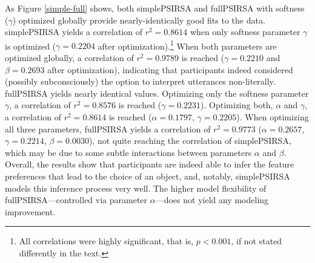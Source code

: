 \documentclass[10pt,a4paper]{article}
\begin{document}
As Figure \ref{simple-full} shows, both simplePSIRSA and fullPSIRSA with softness ($\gamma$) optimized globally provide nearly-identically good fits to the data.
simplePSIRSA yields a correlation of $r^2 = 0.8614$ when only softness parameter $\gamma$ is optimized ($\gamma=0.2204$ after optimization).\footnote{All correlations were highly significant, that is, $p < 0.001$, if not stated differently in the text.} 
When both parameters are optimized globally, a correlation of $r^2 = 0.9789$ is reached
($\gamma=0.2210$ and $\beta=0.2693$ after optimization), indicating that participants indeed considered (possibly subconsciously) the option to interpret utterances non-literally. 
fullPSIRSA yields nearly identical values.
Optimizing only the softness parameter $\gamma$, a correlation of $r^2 = 0.8576$ is reached ($\gamma=0.2231$).
Optimizing both, $\alpha$ and $\gamma$, a correlation of $r^2 = 0.8614$ is reached ($\alpha=0.1797$, $\gamma=0.2205$).
When optimizing all three parameters, fullPSIRSA yields a correlation of $r^2 = 0.9773$ ($\alpha=0.2657$, $\gamma=0.2214$, $\beta=0.0030$), not quite reaching the correlation of simplePSIRSA, which may be due to some subtle interactions between parameters $\alpha$ and $\beta$. 
Overall, the results show that participants are indeed able to infer the feature preferences that lead to the choice of an object, and, notably, simplePSIRSA models this inference process very well.
The higher model flexibility of fullPSIRSA---controlled via parameter $\alpha$---does not yield any modeling improvement. 

\end{document}
